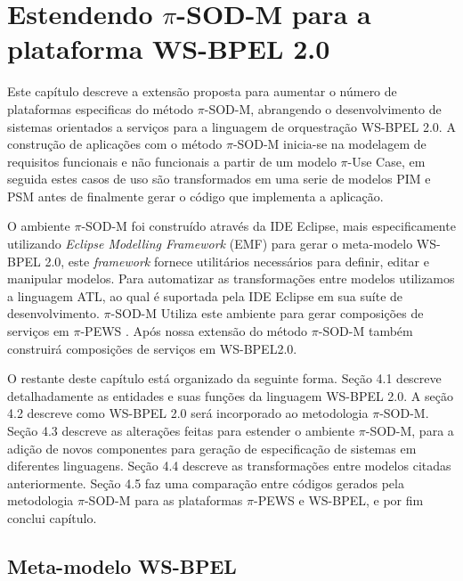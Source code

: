 \chapter{Estendendo $\pi$-SOD-M para a plataforma WS-BPEL 2.0}
Este capítulo descreve a extensão proposta para aumentar o número de  plataformas especificas do método $\pi$-SOD-M, abrangendo o desenvolvimento de sistemas orientados a serviços para a linguagem de orquestração WS-BPEL 2.0. A construção de aplicações com o método $\pi$-SOD-M inicia-se na modelagem de requisitos funcionais e não funcionais a partir de um modelo $\pi$-Use Case, em seguida estes casos de uso são transformados em uma serie de modelos PIM e PSM antes de finalmente gerar o código que implementa a aplicação.

O ambiente $\pi$-SOD-M foi construído através da IDE Eclipse, mais especificamente utilizando \textit{Eclipse Modelling Framework} (EMF) para gerar o meta-modelo WS-BPEL 2.0, este \textit{framework} fornece utilitários necessários para definir, editar e manipular modelos. Para automatizar as transformações entre modelos utilizamos a linguagem ATL, ao qual é suportada pela IDE Eclipse em sua suíte de desenvolvimento. $\pi$-SOD-M Utiliza este ambiente para gerar composições de serviços em $\pi$-PEWS \cite{Placido}. Após nossa extensão do método $\pi$-SOD-M também construirá composições de serviços em WS-BPEL2.0.

O restante deste capítulo está organizado da seguinte forma. Seção 4.1 descreve detalhadamente as entidades e suas funções da linguagem WS-BPEL 2.0. A seção 4.2 descreve como WS-BPEL 2.0 será incorporado ao metodologia $\pi$-SOD-M. Seção 4.3 descreve as alterações feitas para estender o ambiente $\pi$-SOD-M, para a adição de novos componentes para geração de especificação de sistemas em diferentes linguagens. Seção 4.4 descreve as transformações entre modelos citadas anteriormente. Seção 4.5 faz uma comparação entre códigos gerados pela metodologia $\pi$-SOD-M para as plataformas $\pi$-PEWS e WS-BPEL, e  por fim conclui capítulo.
\section{Meta-modelo WS-BPEL}%


